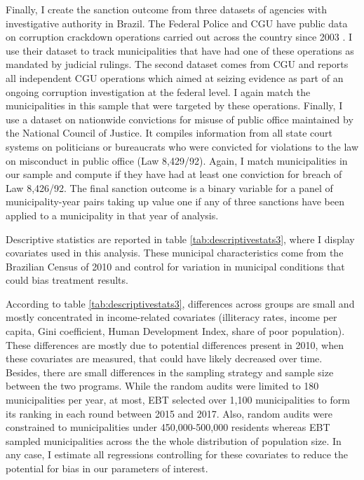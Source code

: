 \documentclass[11pt]{article}
\begin{document}
Finally, I create the sanction outcome from three datasets of agencies with investigative authority in Brazil. The Federal Police and CGU have public data on corruption crackdown operations carried out across the country since 2003 \citep[also used in][]{AvisGovernmentAuditsReduce2018}. I use their dataset to track municipalities that have had one of these operations as mandated by judicial rulings. The second dataset comes from CGU and reports all independent CGU operations which aimed at seizing evidence as part of an ongoing corruption investigation at the federal level. I again match the municipalities in this sample that were targeted by these operations. Finally, I use a dataset on nationwide convictions for misuse of public office maintained by the National Council of Justice. It compiles information from all state court systems on politicians or bureaucrats who were convicted for violations to the law on misconduct in public office (Law 8,429/92). Again, I match municipalities in our sample and compute if they have had at least one conviction for breach of Law 8,426/92. The final sanction outcome is a binary variable for a panel of municipality-year pairs taking up value one if any of three sanctions have been applied to a municipality in that year of analysis.

Descriptive statistics are reported in table \ref{tab:descriptivestats3}, where I display covariates used in this analysis. These municipal characteristics come from the Brazilian Census of 2010 and control for variation in municipal conditions that could bias treatment results.



According to table \ref{tab:descriptivestats3}, differences across groups are small and mostly concentrated in income-related covariates (illiteracy rates, income per capita, Gini coefficient, Human Development Index, share of poor population). These differences are mostly due to potential differences present in 2010, when these covariates are measured, that could have likely decreased over time. Besides, there are small differences in the sampling strategy and sample size between the two programs. While the random audits were limited to 180 municipalities per year, at most, EBT selected over 1,100 municipalities to form its ranking in each round between 2015 and 2017. Also, random audits were constrained to municipalities under 450,000-500,000 residents whereas EBT sampled municipalities across the the whole distribution of population size. In any case, I estimate all regressions controlling for these covariates to reduce the potential for bias in our parameters of interest.
\end{document}
